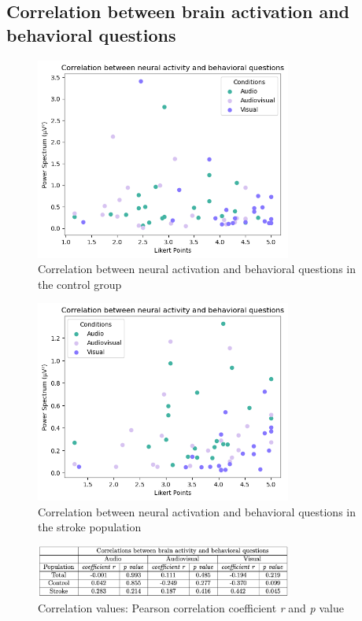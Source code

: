 \clearpage
\subsection*{Correlation between brain activation and behavioral questions}
\begin{figure}[H]
    \centering
    \includegraphics[width=0.75\textwidth]{correlations/corr_na_q_control.png}
    \caption{Correlation between neural activation and behavioral questions in the control group}
    \label{fig: correlation control questions} 
\end{figure}
\begin{figure}[H]
    \centering
    \includegraphics[width=0.75\textwidth]{correlations/corr_na_q_stroke.png}
    \caption{Correlation between neural activation and behavioral questions in the stroke population}
    \label{fig: correlation stroke questions} 
\end{figure}
\begin{figure}[H]
    \centering
    \includegraphics[width=0.75\textwidth]{correlations/corr_values_na_q.png}
    \caption{Correlation values: Pearson correlation coefficient \textit{r} and \textit{p} value}
    \label{fig: correlation values questions} 
\end{figure}